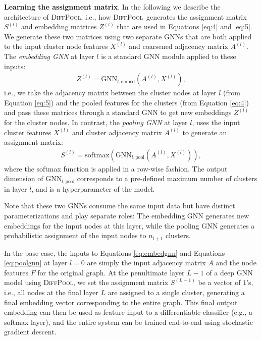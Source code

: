 \documentclass{article}
\newcommand{\xhdr}[1]{{\noindent\bfseries #1}.}
\newcommand{\name}{\textsc{DiffPool}\xspace}
\newcommand{\gnn}{\textrm{GNN}}
\begin{document}
\xhdr{Learning the assignment matrix}
In the following we describe the architecture of \name, i.e., how \name\ generates the assignment matrix $S^{(l)}$ and embedding matrices $Z^{(l)}$ that are used in Equations \eqref{eq:4} and \eqref{eq:5}.
We generate these two matrices using two separate GNNs that are both applied to the input cluster node features $X^{(l)}$ and coarsened adjacency matrix $A^{(l)}$.
The {\em embedding GNN} at layer $l$ is a standard GNN module applied to these inputs:
\begin{align}\label{eq:embedgnn}
   Z^{(l)} = \gnn_{l, \textrm{embed}}(A^{(l)}, X^{(l)}),
\end{align}
i.e., we take the adjacency matrix between the cluster nodes at layer $l$ (from Equation \ref{eq:5}) and the pooled features for the clusters (from Equation \ref{eq:4}) and pass these matrices through a standard GNN to get new embeddings $Z^{(l)}$ for the cluster nodes. 
In contrast, the {\em pooling GNN} at layer $l$, uses the input cluster features $X^{(l)}$ and cluster adjacency matrix $A^{(l)}$ to generate an assignment matrix:
\begin{align}\label{eq:poolgnn}
    S^{(l)} = \textrm{softmax}\left(\gnn_{l,\text{pool}}(A^{(l)}, X^{(l)})\right),
\end{align}
where the softmax function is applied in a row-wise fashion.
The output dimension of $\gnn_{l,\text{pool}}$ corresponds to a pre-defined maximum number of clusters in layer $l$, and is a hyperparameter of the model.

Note that these two GNNs consume the same input data but have distinct parameterizations and play separate roles:
The embedding GNN generates new embeddings for the input nodes at this layer, while the pooling GNN generates a probabilistic assignment of the input nodes to $n_{l+1}$ clusters.

In the base case, the inputs to Equations \eqref{eq:embedgnn} and Equations \eqref{eq:poolgnn} at layer $l=0$ are simply the input adjacency matrix $A$ and the node features $F$ for the original graph.
At the penultimate layer $L-1$ of a deep GNN model using \name, we set the assignment matrix $S^{(L-1)}$ be a vector of $1$'s, i.e., all nodes at the final layer $L$ are assigned to a single cluster, generating a final embedding vector corresponding to the entire graph.
This final output embedding can then be used as feature input to a differentiable classifier (e.g., a softmax layer), and the entire system can be trained end-to-end using stochastic gradient descent. 
\end{document}
